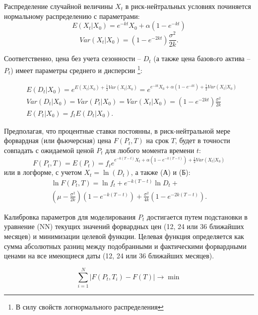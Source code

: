 \documentclass[12pt, a4paper]{article}
\begin{document}
Распределение случайной величины $X_t$ в риск-нейтральных условиях починяется нормальному распределению с параметрами:
\begin{equation}
 E(X_t| X_0) = e^{-kt} X_0 + \alpha (1-e^{-kt}) 
\end{equation}
\begin{equation}
 Var(X_t| X_0) = (1-e^{-2kt}) \frac{\sigma^2}{2k} .
\end{equation}

Соответственно, цена без учета сезонности --  $D_t$ (а также цена базовoго актива -- $P_t$) имеет параметры среднего и дисперсии \footnote{В силу свойств логнормального распределения}:

\begin{equation}
    \begin{aligned}  
    & E(D_t|X_0) = e^{E(X_t|X_0) + \frac{1}{2} Var(X_t|X_0)} = e^{e^{-kt}X_0 + \alpha (1 - e^{-kt}) + \frac{1}{2} Var(X_t|X_0)} \\
    & Var(D_t| X_0) = Var(P_t| X_0) = Var(X_t| X_0) = (1-e^{-2kt} ) \frac{\sigma^2}{2k} \\
    & E(P_t|X_0) = f_t E(D_t|X_0).
    \end{aligned}
\end{equation}

Предполагая, что процентные ставки постоянны, в риск-нейтральной мере форвардная (или фьючерсная) цена $F(P_t,T)$ на срок $T$, будет в точности совпадать с ожидаемой ценой $P_t$ для любого момента времени $t$:
\begin{equation}
F(P_t, T) = E(P_t) = f_t e^{e^{-k(T-t)}X_t+ \alpha (1 - e^{-k(T-t)}) + \frac{1}{2} Var(X_t|X_0)}
\end{equation}
 или в логформе, с учетом $X_t=\ln(D_t)$, а также (А) и (Б): %
\begin{multline}
\ln F(P_t, T) = 
\ln f_t + e^{-k(T-t)} \ln D_t + \\
(\mu - \frac{\sigma^2}{2k})(1-e^{-k(T-t)}) +  
\frac{\sigma^2}{4k}(1-e^{-2k(T-t)}).         
\end{multline}

Калибровка параметров для моделирования $P_t$ достигается путем подстановки в уравнение (NN) текущих значений форвардных цен (12, 24 или 36 ближайших месяцев) и минимизации целевой функции. Целевая функция определяется как сумма абсолютных разниц между подобранными и фактическими форвардными ценами на все имеющиеся даты (12, 24 или 36 ближайших месяцев).

\begin{equation}
 \sum_{i = 1}^{N} |{F(P_t,T_i ) - F(T)}| \to \min
\end{equation}
\end{document}
